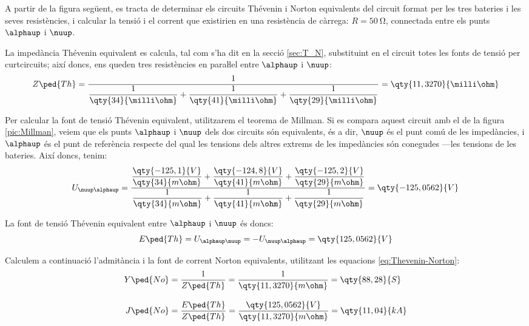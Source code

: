 \begin{exemple}\label{ex:MillmanBateries}
	\addcontentsxms{\MillmanBateries}
    A partir de la figura següent, es tracta de determinar els circuits
    Thévenin i Norton equivalents del circuit format per les tres
    bateries i les seves resistències, i calcular la tensió i el
    corrent que existirien en una resistència de càrrega:
    $R=\qty{50}{\ohm}$, connectada entre els punts $\alphaup$
    i $\nuup$.

    \begin{center}
        
    \end{center}

    La impedància Thévenin equivalent es calcula, tal com s'ha dit en la secció \ref{sec:T_N},
    substituint en el circuit totes les fonts de tensió per curtcircuits; així doncs, ens
    queden tres resistències en paraŀlel entre $\alphaup$ i $\nuup$:
    \[
    Z\ped{Th} = \frac{1}{\dfrac{1}{\qty{34}{\milli\ohm}} +
    \dfrac{1}{\qty{41}{\milli\ohm}} + \dfrac{1}{\qty{29}{\milli\ohm}}} =
    \qty{11,3270}{\milli\ohm}
    \]

    Per calcular la font de tensió Thévenin equivalent, utilitzarem el
    teorema de Millman. Si es compara aquest circuit amb el de la figura
    \vref{pic:Millman}, veiem que els punts $\alphaup$ i $\nuup$ dels dos
    circuits són equivalents, és a dir, $\nuup$ és el punt comú de les
    impedàncies, i $\alphaup$ és el punt de referència respecte del qual les tensions  dels altres extrems de les impedàncies
    són conegudes ---les tensions de les bateries. Així doncs, tenim:
    \[
    U_{\nuup\alphaup} = \frac{\dfrac{\qty{-125,1}{V}}{\qty{34}{m\ohm}} +
    \dfrac{\qty{-124,8}{V}}{\qty{41}{m\ohm}} +
    \dfrac{\qty{-125,2}{V}}{\qty{29}{m\ohm}}}{\dfrac{1}{\qty{34}{m\ohm}}
    + \dfrac{1}{\qty{41}{m\ohm}} + \dfrac{1}{\qty{29}{m\ohm}}} =
    \qty{-125,0562}{V}
    \]

    La font de tensió  Thévenin equivalent entre $\alphaup$ i $\nuup$ és doncs:
    \[
    E\ped{Th} = U_{\alphaup\nuup} = -U_{\nuup\alphaup} = \qty{125,0562}{V}
    \]

    Calculem a continuació l'admitància i la font de corrent  Norton equivalents, utilitzant
    les equacions \eqref{eq:Thevenin-Norton}:
    \begin{align*}
        Y\ped{No} &= \frac{1}{Z\ped{Th}} = \frac{1}{\qty{11,3270}{m\ohm}} = \qty{88,28}{S}
        \\[2ex]
        J\ped{No} &= \frac{E\ped{Th}}{Z\ped{Th}} =
        \frac{\qty{125,0562}{V}}{\qty{11,3270}{m\ohm}}= \qty{11,04}{kA}
    \end{align*}


\end{exemple}
